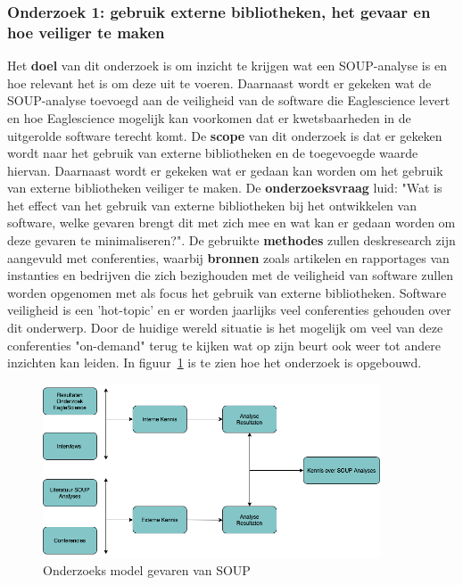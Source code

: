\subsubsection{Onderzoek 1: gebruik externe bibliotheken, het gevaar en hoe veiliger te maken}
Het \textbf{doel} van dit onderzoek is om inzicht te krijgen wat een SOUP-analyse is en hoe relevant het is om deze uit te voeren. Daarnaast wordt er gekeken wat de SOUP-analyse toevoegd aan de veiligheid van de software die Eaglescience levert en hoe Eaglescience mogelijk kan voorkomen dat er kwetsbaarheden in de uitgerolde software terecht komt.
De \textbf{scope} van dit onderzoek is dat er gekeken wordt naar het gebruik van externe bibliotheken en de toegevoegde waarde hiervan. Daarnaast wordt er gekeken wat er gedaan kan worden om het gebruik van externe bibliotheken veiliger te maken.
De \textbf{onderzoeksvraag} luid: "Wat is het effect van het gebruik van externe bibliotheken bij het ontwikkelen van software, welke gevaren brengt dit met zich mee en wat kan er gedaan worden om deze gevaren te minimaliseren?".
De gebruikte \textbf{methodes} zullen deskresearch zijn aangevuld met conferenties, waarbij \textbf{bronnen} zoals artikelen en rapportages van instanties en bedrijven die zich bezighouden met de veiligheid van software zullen worden opgenomen met als focus het gebruik van externe bibliotheken. Software veiligheid is een 'hot-topic' en er worden jaarlijks veel conferenties gehouden over dit onderwerp. Door de huidige wereld situatie is het mogelijk om veel van deze conferenties "on-demand" terug te kijken wat op zijn beurt ook weer tot andere inzichten kan leiden. In figuur~\ref{fig:OnderzoeksModelNoodZaakSOUP} is te zien hoe het onderzoek is opgebouwd.
\begin{figure}[htbp]
    \myfloatalign
    \includegraphics[width=10cm]{gfx/OnderzoeksmodelSOUP}
    \caption{Onderzoeks model gevaren van SOUP}
    \label{fig:OnderzoeksModelNoodZaakSOUP}
\end{figure}



